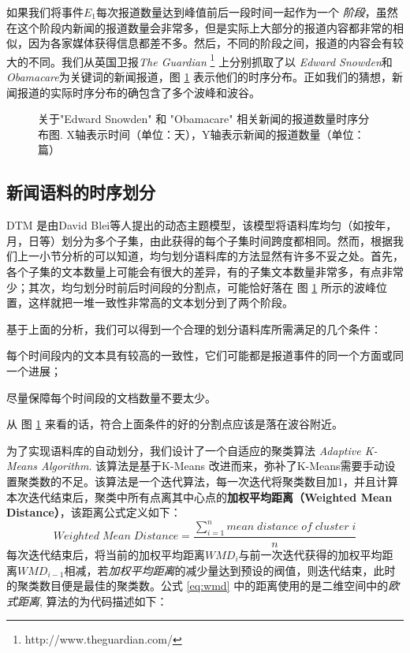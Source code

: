 如果我们将事件$E_1$每次报道数量达到峰值前后一段时间一起作为一个 \emph{阶段}，虽然在这个阶段内新闻的报道数量会非常多，但是实际上大部分的报道内容都非常的相似，因为各家媒体获得信息都差不多。然后，不同的阶段之间，报道的内容会有较大的不同。我们从英国卫报\emph{The Guardian} \footnote{http://www.theguardian.com/} 上分别抓取了以 \emph{Edward Snowden}和\emph{Obamacare}为关键词的新闻报道，图 \ref{fig:temporal-dist} 表示他们的时序分布。正如我们的猜想，新闻报道的实际时序分布的确包含了多个波峰和波谷。

\begin{figure}[htb]
	\centering
	\caption{关于"Edward Snowden" 和 "Obamacare" 相关新闻的报道数量时序分布图. X轴表示时间（单位：天），Y轴表示新闻的报道数量（单位：篇）}
	\label{fig:temporal-dist}
\end{figure}

\subsection{新闻语料的时序划分}
\label{sec:ada-kmeans}
DTM \cite{Blei:2006}是由David Blei等人提出的动态主题模型，该模型将语料库均匀（如按年，月，日等）划分为多个子集，由此获得的每个子集时间跨度都相同。然而，根据我们上一小节分析的可以知道，均匀划分语料库的方法显然有许多不妥之处。首先，各个子集的文本数量上可能会有很大的差异，有的子集文本数量非常多，有点非常少；其次，均匀划分时前后时间段的分割点，可能恰好落在 图 \ref{fig:temporal-dist} 所示的波峰位置，这样就把一堆一致性非常高的文本划分到了两个阶段。

基于上面的分析，我们可以得到一个合理的划分语料库所需满足的几个条件：
\begin{inparaenum}[\itshape 1 \upshape)]
\item 每个时间段内的文本具有较高的一致性，它们可能都是报道事件的同一个方面或同一个进展；
\item 尽量保障每个时间段的文档数量不要太少。
\end{inparaenum}
从 图 \ref{fig:temporal-dist} 来看的话，符合上面条件的好的分割点应该是落在波谷附近。

为了实现语料库的自动划分，我们设计了一个自适应的聚类算法 \emph{Adaptive K-Means Algorithm}. 该算法是基于K-Means \cite{kanungo2002efficient} 改进而来，弥补了K-Means需要手动设置聚类数的不足。该算法是一个迭代算法，每一次迭代将聚类数目加1，并且计算本次迭代结束后，聚类中所有点离其中心点的\textbf{加权平均距离（Weighted Mean Distance）}，该距离公式定义如下：
\begin{equation}
\label{eq:wmd}
Weighted\;Mean\;Distance=\frac{\sum_{i=1}^{n}{mean\;distance\;of\;cluster\;i}}{n}
\end{equation}
每次迭代结束后，将当前的加权平均距离$WMD_i$与前一次迭代获得的加权平均距离$WMD_{i-1}$相减，若\emph{加权平均距离}的减少量达到预设的阀值，则迭代结束，此时的聚类数目便是最佳的聚类数。公式 \ref{eq:wmd} 中的距离使用的是二维空间中的\emph{欧式距离}, 算法的为代码描述如下：

